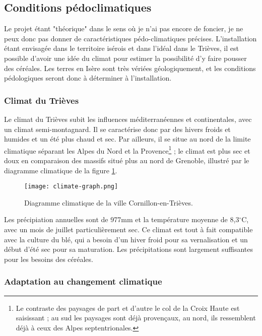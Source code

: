 \documentclass{book}
\begin{document}
\subsection{Conditions pédoclimatiques}

Le projet étant "théorique" dans le sens où je n'ai pas encore de foncier, je ne peux donc pas donner de caractéristiques pédo-climatiques précises. L'installation étant envisagée dans le territoire isérois et dans l'idéal dans le Trièves, il est possible d'avoir une idée du climat pour estimer la possibilité d'y faire pousser des céréales. Les terres en Isère sont très vériées géologiquement, et les conditions pédologiques seront donc à déterminer à l'installation.

\subsubsection{Climat du Trièves}

Le climat du Trièves subit les influences méditerranéennes et continentales, avec un climat semi-montagnard. Il se caractérise donc par des hivers froids et humides et un été plus chaud et sec. Par ailleurs, il se situe au nord de la limite climatique séparant les Alpes du Nord et la Provence\footnote{Le contraste des paysages de part et d'autre le col de la Croix Haute est saisissant ; au sud les paysages sont déjà provençaux, au nord, ils ressemblent déjà à ceux des Alpes septentrionales.} ; le climat est plus sec et doux en comparaison des massifs situé plus au nord de Grenoble, illustré par le diagramme climatique de la figure \ref{fig:climat}.

\begin{figure}[h!]
\begin{center}
	\texttt{[image: climate-graph.png]}
	\caption{Diagramme climatique de la ville Cornillon-en-Trièves.}
	\label{fig:climat}
\end{center}
\end{figure}

Les précipiation annuelles sont de 977mm et la température moyenne de 8,3$^\circ$C, avec un mois de juillet particulièrement sec. Ce climat est tout à fait compatible avec la culture du blé, qui a besoin d'un hiver froid pour sa vernalisation et un début d'été sec pour sa maturation. Les précipitations sont largement suffisantes pour les besoins des céréales.

\subsubsection{Adaptation au changement climatique}
\end{document}
